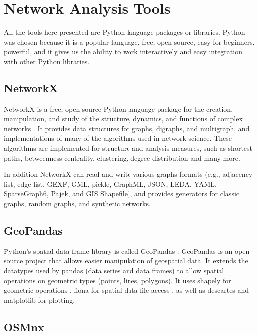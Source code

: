 \section{Network Analysis Tools}

All the tools here presented are Python language packages or libraries. Python was chosen because it is a popular language, free, open-source, easy for beginners, powerful, and it gives us the ability to work interactively and easy integration with other Python libraries.


\subsection{NetworkX}

NetworkX is a free, open-source Python language package for the creation, manipulation, and study of the structure, dynamics, and functions of complex networks \cite{hagberg-schult-swart-networkx_2008, networkx_doc}. It provides data structures for graphs, digraphs, and multigraph, and implementations of many of the algorithms used in network science. These algorithms are implemented for structure and analysis measures, such as shortest paths, betweenness centrality, clustering, degree distribution and many more.

In addition NetworkX can read and write various graphs formats (e.g., adjacency list, edge list, GEXF, GML, pickle, GraphML, JSON, LEDA, YAML, SparseGraph6, Pajek, and GIS Shapefile), and provides generators for classic graphs, random graphs, and synthetic networks.


\subsection{GeoPandas}

Python's spatial data frame library is called GeoPandas \cite{geopandas}. GeoPandas is an open source project that allows easier manipulation of geospatial data. It extends the datatypes used by pandas (data series and data frames) \cite{pandas, mckinney-proc-scipy-2010} to allow spatial operations on geometric types (points, lines, polygons). It uses shapely for geometric operations \cite{shapely}, fiona for spatial data file access \cite{fiona}, as well as descartes \cite{descartes} and matplotlib \cite{matplotlib, Hunter:2007} for plotting.

\subsection{OSMnx}

